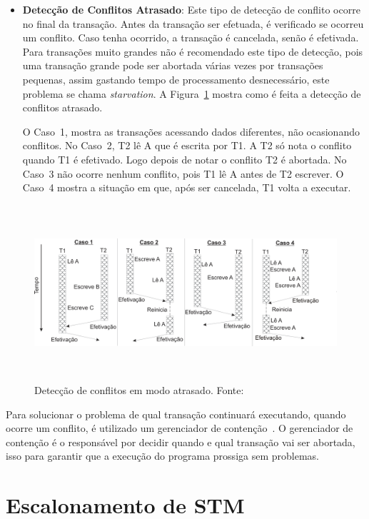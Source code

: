 \documentclass[ti]{texufpel}
\begin{document}
\begin{itemize}
 \item \textbf{Detecção de Conflitos Atrasado}: Este tipo de detecção de conflito ocorre no final da transação.  Antes da transação ser efetuada, é verificado se ocorreu um conflito. Caso tenha ocorrido, a transação é cancelada, senão é efetivada. Para transações muito grandes não é recomendado este tipo de detecção, pois uma transação grande pode ser abortada várias vezes por transações pequenas, assim gastando tempo de processamento desnecessário, este problema se chama \emph{starvation}. A Figura~\ref{figuradeteccaoatrasado} mostra como é feita a detecção de conflitos atrasado.

 O Caso~1, mostra as transações acessando dados diferentes, não ocasionando conflitos. No Caso~2, T2 lê A que é escrita por T1. A T2 só nota o conflito quando T1 é efetivado. Logo depois de notar o conflito T2 é abortada. No Caso~3 não ocorre nenhum conflito, pois T1 lê A antes de T2 escrever. O Caso~4 mostra a situação em que, após ser cancelada, T1 volta a executar.
\end{itemize}

\begin{figure}[!htp]
\centering
\includegraphics[height=6.5cm]{Imagens/conflitoatrasado.png}
\caption{Detecção de conflitos em modo atrasado. Fonte:~\cite{rigo07}}
\label{figuradeteccaoatrasado}
\end{figure}

Para solucionar o problema de qual transação continuará executando, quando ocorre um conflito, é utilizado um gerenciador de contenção~\cite{harris10}. O gerenciador de contenção é o responsável por decidir quando e qual transação vai ser abortada, isso para garantir que a execução do programa prossiga sem problemas.

\chapter{Escalonamento de STM}
\end{document}

